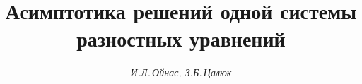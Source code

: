

 







\newcommand{\im}{\operatorname{Im}}


\newcommand{\tts}[1]{} 


 




 


\setcounter{page}{70} 












 


\author{\it И.Л.\,Ойнас, З.Б.\,Цалюк} 




\title{Асимптотика решений одной системы\\


разностных уравнений} 


 


\date{} 




\pagestyle{plain} %


 




\maketitle 


